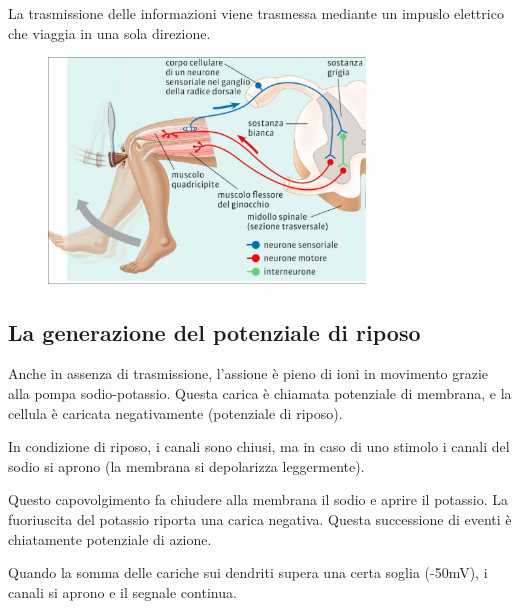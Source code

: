 \documentclass[a4paper]{article}
\begin{document}
La trasmissione delle informazioni viene trasmessa mediante un impuslo elettrico
che viaggia in una sola direzione.


\vspace{0.5cm}

\begin{center}
\begin{figure}[ht]
    \centering
    \includegraphics[width=0.75\textwidth]{./patellare.png}
\end{figure}
\end{center}

\subsection{La generazione del potenziale di riposo}

Anche in assenza di trasmissione, l'assione è pieno di ioni in movimento grazie alla pompa
sodio-potassio. Questa carica è chiamata potenziale di membrana,
e la cellula è caricata negativamente (potenziale di riposo).

In condizione di riposo, i canali sono chiusi, ma in caso di uno stimolo
i canali del sodio si aprono (la membrana si depolarizza leggermente).

Questo capovolgimento fa chiudere alla membrana il sodio e aprire il potassio.
La fuoriuscita del potassio riporta una carica negativa.
Questa successione di eventi è chiatamente potenziale di azione.

Quando la somma delle cariche sui dendriti supera una certa soglia (-50mV),
i canali si aprono e il segnale continua.

\end{document}
